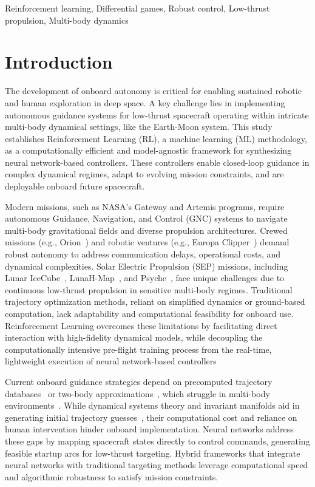 \documentclass[conference]{IEEEtran}
\begin{document}
\begin{IEEEkeywords}
Reinforcement learning, Differential games, Robust control, Low-thrust propulsion, Multi-body dynamics
\end{IEEEkeywords}

\section{Introduction}
The development of onboard autonomy is critical for enabling sustained robotic and human exploration in deep space.
A key challenge lies in implementing autonomous guidance systems for low-thrust spacecraft operating within intricate multi-body dynamical settings, like the Earth-Moon system.
This study establishes Reinforcement Learning (RL), a machine learning (ML) methodology, as a computationally efficient and model-agnostic framework for synthesizing neural network-based controllers. These controllers enable closed-loop guidance in complex dynamical regimes, adapt to evolving mission constraints, and are deployable onboard future spacecraft.

Modern missions, such as NASA's Gateway and Artemis programs, require autonomous Guidance, Navigation, and Control (GNC) systems to navigate multi-body gravitational fields and diverse propulsion architectures. Crewed missions (e.g., Orion~\cite{Hart}) and robotic ventures (e.g., Europa Clipper~\cite{Clipper}) demand robust autonomy to address communication delays, operational costs, and dynamical complexities. Solar Electric Propulsion (SEP) missions, including Lunar IceCube~\cite{Bosanac}, LunaH-Map~\cite{Map}, and Psyche~\cite{Psyche}, face unique challenges due to continuous low-thrust propulsion in sensitive multi-body regimes. Traditional trajectory optimization methods, reliant on simplified dynamics or ground-based computation, lack adaptability and computational feasibility for onboard use. Reinforcement Learning overcomes these limitations by facilitating direct interaction with high-fidelity dynamical models, while decoupling the computationally intensive pre-flight training process from the real-time, lightweight execution of neural network-based controllers

Current onboard guidance strategies depend on precomputed trajectory databases~\cite{13} or two-body approximations~\cite{9}, which struggle in multi-body environments~\cite{12}. While dynamical systems theory and invariant manifolds aid in generating initial trajectory guesses~\cite{11,12}, their computational cost and reliance on human intervention hinder onboard implementation. Neural networks address these gaps by mapping spacecraft states directly to control commands, generating feasible startup arcs for low-thrust targeting. Hybrid frameworks that integrate neural networks with traditional targeting methods leverage computational speed and algorithmic robustness to satisfy mission constraints.
\end{document}
